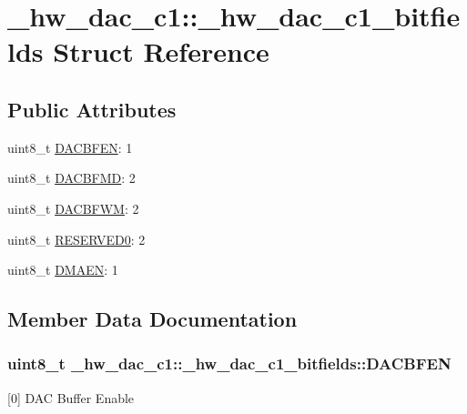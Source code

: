 \hypertarget{struct__hw__dac__c1_1_1__hw__dac__c1__bitfields}{}\section{\+\_\+hw\+\_\+dac\+\_\+c1\+:\+:\+\_\+hw\+\_\+dac\+\_\+c1\+\_\+bitfields Struct Reference}
\label{struct__hw__dac__c1_1_1__hw__dac__c1__bitfields}
\subsection*{Public Attributes}
\begin{DoxyCompactItemize}
\item 
uint8\+\_\+t \hyperlink{struct__hw__dac__c1_1_1__hw__dac__c1__bitfields_a24fecebfddd930b415c15a3da39b7ad1}{D\+A\+C\+B\+F\+EN}\+: 1
\item 
uint8\+\_\+t \hyperlink{struct__hw__dac__c1_1_1__hw__dac__c1__bitfields_a27572b6fc85cd5f9d983f75c753bac2c}{D\+A\+C\+B\+F\+MD}\+: 2
\item 
uint8\+\_\+t \hyperlink{struct__hw__dac__c1_1_1__hw__dac__c1__bitfields_afd331900515a962f001e7eec7c48ca71}{D\+A\+C\+B\+F\+WM}\+: 2
\item 
uint8\+\_\+t \hyperlink{struct__hw__dac__c1_1_1__hw__dac__c1__bitfields_a9eebbaa5f274c9af97a8928035d8f177}{R\+E\+S\+E\+R\+V\+E\+D0}\+: 2
\item 
uint8\+\_\+t \hyperlink{struct__hw__dac__c1_1_1__hw__dac__c1__bitfields_a03529a304a07254b1aff09db1ebbb37d}{D\+M\+A\+EN}\+: 1
\end{DoxyCompactItemize}


\subsection{Member Data Documentation}
\subsubsection[{\texorpdfstring{D\+A\+C\+B\+F\+EN}{DACBFEN}}]{\setlength{\rightskip}{0pt plus 5cm}uint8\+\_\+t \+\_\+hw\+\_\+dac\+\_\+c1\+::\+\_\+hw\+\_\+dac\+\_\+c1\+\_\+bitfields\+::\+D\+A\+C\+B\+F\+EN}\hypertarget{struct__hw__dac__c1_1_1__hw__dac__c1__bitfields_a24fecebfddd930b415c15a3da39b7ad1}{}\label{struct__hw__dac__c1_1_1__hw__dac__c1__bitfields_a24fecebfddd930b415c15a3da39b7ad1}
\mbox{[}0\mbox{]} D\+AC Buffer Enable 
